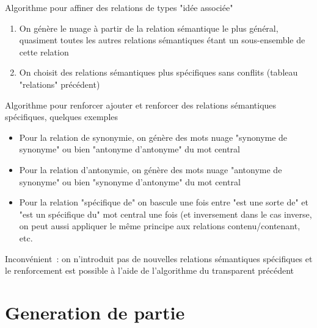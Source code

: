 \documentclass{beamer}
\begin{document}
\begin{frame}
  Algorithme pour affiner des relations de types "idée associée"
  \begin{enumerate}
  \item On génère le nuage à partir de la relation sémantique le plus général, quasiment toutes les autres relations sémantiques étant un sous-ensemble de cette relation
  \item On choisit des relations sémantiques plus spécifiques sans conflits (tableau "relations" précédent)
  \end{enumerate}  
\end{frame}

\begin{frame}
  Algorithme pour renforcer ajouter et renforcer des relations sémantiques spécifiques, quelques exemples
\begin{itemize}
\item Pour la relation de synonymie, on génère des mots nuage "synonyme de synonyme" ou bien "antonyme d'antonyme" du mot central
\item Pour la relation d'antonymie, on génère des mots nuage "antonyme de synonyme" ou bien "synonyme d'antonyme" du mot central
\item Pour la relation "spécifique de" on bascule une fois entre "est une sorte de" et "est un spécifique du" mot central une fois (et inversement dans le cas inverse, on peut aussi appliquer le même principe aux relations contenu/contenant, etc.
\end{itemize}
Inconvénient~: on n'introduit pas de nouvelles relations sémantiques spécifiques et le renforcement est possible à l'aide de l'algorithme du transparent précédent
\end{frame}

\section{Generation de partie}

\begin{frame}
\end{frame}
\end{document}
